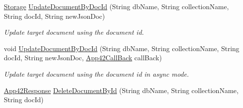 \begin{DoxyCompactItemize}
\hyperlink{classcom_1_1shephertz_1_1app42_1_1paas_1_1sdk_1_1csharp_1_1storage_1_1_storage}{Storage} \hyperlink{classcom_1_1shephertz_1_1app42_1_1paas_1_1sdk_1_1csharp_1_1storage_1_1_storage_service_ac49e60b281704dd95e4a06ed540caf59}{Update\+Document\+By\+Doc\+Id} (String db\+Name, String collection\+Name, String doc\+Id, String new\+Json\+Doc)
\begin{DoxyCompactList}\small\item\em Update target document using the document id. \end{DoxyCompactList}\item 
void \hyperlink{classcom_1_1shephertz_1_1app42_1_1paas_1_1sdk_1_1csharp_1_1storage_1_1_storage_service_abb81912a399d8821f70f581757d2fee3}{Update\+Document\+By\+Doc\+Id} (String db\+Name, String collection\+Name, String doc\+Id, String new\+Json\+Doc, \hyperlink{interfacecom_1_1shephertz_1_1app42_1_1paas_1_1sdk_1_1csharp_1_1_app42_call_back}{App42\+Call\+Back} call\+Back)
\begin{DoxyCompactList}\small\item\em Update target document using the document id in async mode. \end{DoxyCompactList}\item 
\hypertarget{classcom_1_1shephertz_1_1app42_1_1paas_1_1sdk_1_1csharp_1_1storage_1_1_storage_service_aec973386c0ac6141f7444a7424edbb1d}{\hyperlink{classcom_1_1shephertz_1_1app42_1_1paas_1_1sdk_1_1csharp_1_1_app42_response}{App42\+Response} \hyperlink{classcom_1_1shephertz_1_1app42_1_1paas_1_1sdk_1_1csharp_1_1storage_1_1_storage_service_aec973386c0ac6141f7444a7424edbb1d}{Delete\+Document\+By\+Id} (String db\+Name, String collection\+Name, String doc\+Id)}\label{classcom_1_1shephertz_1_1app42_1_1paas_1_1sdk_1_1csharp_1_1storage_1_1_storage_service_aec973386c0ac6141f7444a7424edbb1d}


\end{DoxyCompactItemize}
